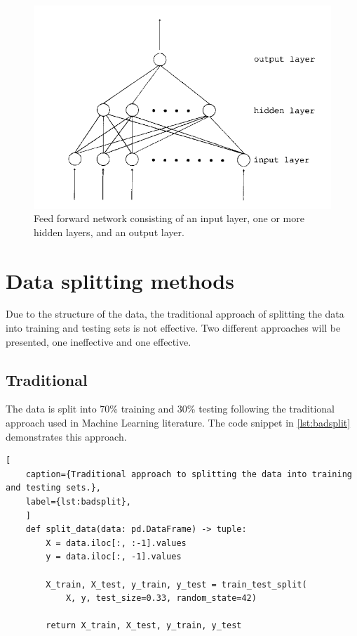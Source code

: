         \begin{figure}[H]
            \centering
            \includegraphics[width=.7\textwidth]{../src/resources/images/models/feedforward.png}
            \caption{
                Feed forward network consisting of an input layer, one or more hidden layers, and an output layer. \cite{svozil_introduction_1997}
            }
            \label{fig:multi_layer_perceptron}
        \end{figure}
    
    \newpage
        
        
    \section{Data splitting methods}
        
            Due to the structure of the data, the traditional approach of splitting the data into training and testing sets is not effective. Two different approaches will be presented, one ineffective and one effective.

            \subsection{Traditional} \label{sec:badsplit}
                        
                    The data is split into 70\% training and 30\% testing following the traditional approach used in Machine Learning literature. The code snippet in \ref{lst:badsplit} demonstrates this approach. 
            
\begin{lstlisting}[
    caption={Traditional approach to splitting the data into training and testing sets.}, 
    label={lst:badsplit},
    ]            
    def split_data(data: pd.DataFrame) -> tuple:        
        X = data.iloc[:, :-1].values
        y = data.iloc[:, -1].values
        
        X_train, X_test, y_train, y_test = train_test_split(
            X, y, test_size=0.33, random_state=42)
        
        return X_train, X_test, y_train, y_test
\end{lstlisting}
                
